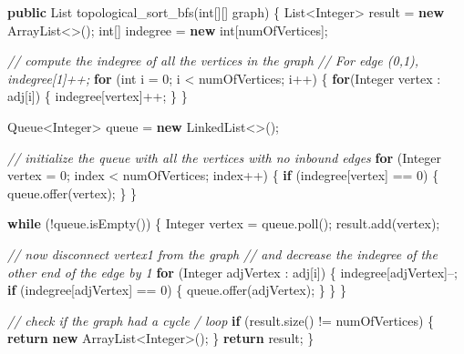 \documentclass[]{book}
\newenvironment{Shaded}{\begin{snugshade}}{\end{snugshade}}
\newcommand{\BuiltInTok}[1]{#1}
\newcommand{\CommentTok}[1]{\textcolor[rgb]{0.56,0.35,0.01}{\textit{#1}}}
\newcommand{\DataTypeTok}[1]{\textcolor[rgb]{0.13,0.29,0.53}{#1}}
\newcommand{\DecValTok}[1]{\textcolor[rgb]{0.00,0.00,0.81}{#1}}
\newcommand{\FunctionTok}[1]{\textcolor[rgb]{0.00,0.00,0.00}{#1}}
\newcommand{\KeywordTok}[1]{\textcolor[rgb]{0.13,0.29,0.53}{\textbf{#1}}}
\newcommand{\NormalTok}[1]{#1}
\begin{document}
\begin{Shaded}
\begin{Highlighting}[]
\KeywordTok{public} \BuiltInTok{List} \FunctionTok{topological_sort_bfs}\NormalTok{(}\DataTypeTok{int}\NormalTok{[][] graph) \{}
    \BuiltInTok{List}\NormalTok{<}\BuiltInTok{Integer}\NormalTok{> result = }\KeywordTok{new} \BuiltInTok{ArrayList}\NormalTok{<>();}
    \DataTypeTok{int}\NormalTok{[] indegree = }\KeywordTok{new} \DataTypeTok{int}\NormalTok{[numOfVertices];}

    \CommentTok{// compute the indegree of all the vertices in the graph}
    \CommentTok{// For edge (0,1), indegree[1]++;}
    \KeywordTok{for}\NormalTok{ (}\DataTypeTok{int}\NormalTok{ i = }\DecValTok{0}\NormalTok{; i < numOfVertices; i++) \{}
        \KeywordTok{for}\NormalTok{(}\BuiltInTok{Integer}\NormalTok{ vertex : adj[i]) \{}
\NormalTok{            indegree[vertex]++;}
\NormalTok{        \}}
\NormalTok{    \}}

    \BuiltInTok{Queue}\NormalTok{<}\BuiltInTok{Integer}\NormalTok{> queue = }\KeywordTok{new} \BuiltInTok{LinkedList}\NormalTok{<>();}

    \CommentTok{// initialize the queue with all the vertices with no inbound edges}
    \KeywordTok{for}\NormalTok{ (}\BuiltInTok{Integer}\NormalTok{ vertex = }\DecValTok{0}\NormalTok{; index < numOfVertices; index++) \{}
        \KeywordTok{if}\NormalTok{ (indegree[vertex] == }\DecValTok{0}\NormalTok{) \{}
\NormalTok{            queue.}\FunctionTok{offer}\NormalTok{(vertex);}
\NormalTok{        \}}
\NormalTok{    \}}

    \KeywordTok{while}\NormalTok{ (!queue.}\FunctionTok{isEmpty}\NormalTok{()) \{}
        \BuiltInTok{Integer}\NormalTok{ vertex = queue.}\FunctionTok{poll}\NormalTok{();}
\NormalTok{        result.}\FunctionTok{add}\NormalTok{(vertex);}

        \CommentTok{// now disconnect vertex1 from the graph}
        \CommentTok{// and decrease the indegree of the other end of the edge by 1}
        \KeywordTok{for}\NormalTok{ (}\BuiltInTok{Integer}\NormalTok{ adjVertex : adj[i]) \{}
\NormalTok{            indegree[adjVertex]--;}
            \KeywordTok{if}\NormalTok{ (indegree[adjVertex] == }\DecValTok{0}\NormalTok{) \{}
\NormalTok{                queue.}\FunctionTok{offer}\NormalTok{(adjVertex);}
\NormalTok{            \}}
\NormalTok{        \}}
\NormalTok{    \}}

    \CommentTok{// check if the graph had a cycle / loop}
    \KeywordTok{if}\NormalTok{ (result.}\FunctionTok{size}\NormalTok{() != numOfVertices) \{}
        \KeywordTok{return} \KeywordTok{new} \BuiltInTok{ArrayList}\NormalTok{<}\BuiltInTok{Integer}\NormalTok{>();}
\NormalTok{    \}}
    \KeywordTok{return}\NormalTok{ result;}
\NormalTok{\}}
\end{Highlighting}
\end{Shaded}
\end{document}
